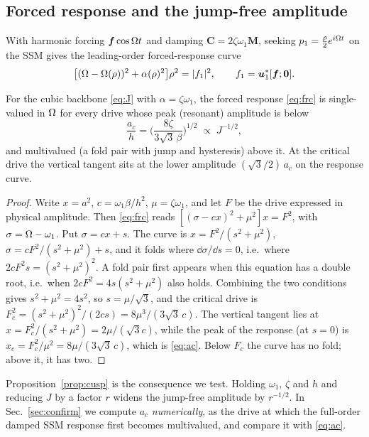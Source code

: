 \subsection{Forced response and the jump-free amplitude}\label{sec:jumpth}
With harmonic forcing $\bm f\cos\Omega t$ and damping $\bm C=2\zeta\omega_1\bm M$, seeking
$p_1=\tfrac\rho2e^{i\Omega t}$ on the SSM gives the leading-order forced-response curve
\begin{equation}
\big[(\Omega-\Omega(\rho))^2+\alpha(\rho)^2\big]\rho^2=|f_1|^2,\qquad f_1=\bm u_1^*[\bm f;\bm0].
\label{eq:frc}
\end{equation}

\begin{proposition}\label{prop:cusp}
For the cubic backbone \eqref{eq:J} with $\alpha=\zeta\omega_1$, the forced response
\eqref{eq:frc} is single-valued in $\Omega$ for every drive whose peak (resonant) amplitude is
below
\begin{equation}
\frac{a_c}{h}=\Big(\frac{8\zeta}{3\sqrt3\,\beta}\Big)^{1/2}\;\propto\;J^{-1/2},
\label{eq:ac}
\end{equation}
and multivalued (a fold pair with jump and hysteresis) above it. At the critical drive the
vertical tangent sits at the lower amplitude $(\sqrt3/2)\,a_c$ on the response curve.
\end{proposition}
\begin{proof}
Write $x=a^2$, $c=\omega_1\beta/h^2$, $\mu=\zeta\omega_1$, and let $F$ be the drive
expressed in physical amplitude. Then \eqref{eq:frc} reads
$[(\sigma-cx)^2+\mu^2]x=F^2$, with $\sigma=\Omega-\omega_1$. Put $\sigma=cx+s$. The curve is
$x=F^2/(s^2+\mu^2)$, $\sigma=cF^2/(s^2+\mu^2)+s$, and it folds where $\dd\sigma/\dd s=0$,
i.e.\ where $2cF^2s=(s^2+\mu^2)^2$. A fold pair first appears when this equation has a
double root, i.e.\ when $2cF^2=4s(s^2+\mu^2)$ also holds. Combining the two conditions
gives $s^2+\mu^2=4s^2$, so $s=\mu/\sqrt3$, and the critical drive is
$F_c^2=(s^2+\mu^2)^2/(2cs)=8\mu^3/(3\sqrt3\,c)$. The vertical tangent lies at
$x=F_c^2/(s^2+\mu^2)=2\mu/(\sqrt3c)$, while the peak of the response (at $s=0$) is
$x_c=F_c^2/\mu^2=8\mu/(3\sqrt3\,c)$, which is \eqref{eq:ac}. Below $F_c$ the curve has no
fold; above it, it has two.
\end{proof}
\noindent Proposition~\ref{prop:cusp} is the consequence we test. Holding $\omega_1$,
$\zeta$ and $h$ and reducing $J$ by a factor $r$ widens the jump-free amplitude by
$r^{-1/2}$. In Sec.~\ref{sec:confirm} we compute $a_c$ \emph{numerically}, as the drive
at which the full-order damped SSM response first becomes multivalued, and compare it
with \eqref{eq:ac}.
